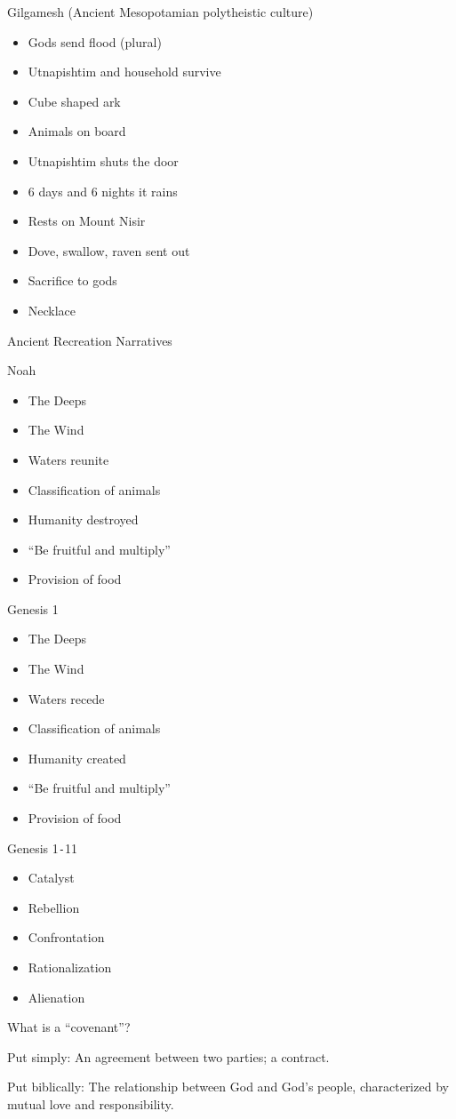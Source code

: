 \documentclass{article}
\begin{document}
    Gilgamesh (Ancient Mesopotamian polytheistic culture)

    \begin{itemize}
        \item Gods send flood (plural)
        \item Utnapishtim and household survive
        \item Cube shaped ark
        \item Animals on board
        \item Utnapishtim shuts the door
        \item 6 days and 6 nights it rains
        \item Rests on Mount Nisir
        \item Dove, swallow, raven sent out
        \item Sacrifice to gods
        \item Necklace
    \end{itemize}

    \centerline{Ancient Recreation Narratives}

    Noah

    \begin{itemize}
        \item The Deeps
        \item The Wind
        \item Waters reunite
        \item Classification of animals
        \item Humanity destroyed
        \item ``Be fruitful and multiply''
        \item Provision of food
    \end{itemize}

    Genesis 1

    \begin{itemize}
        \item The Deeps
        \item The Wind
        \item Waters recede
        \item Classification of animals
        \item Humanity created
        \item ``Be fruitful and multiply''
        \item Provision of food
    \end{itemize}

    \centerline{Genesis 1\texttt{-}11}

    \begin{itemize}
        \item Catalyst
        \item Rebellion
        \item Confrontation
        \item Rationalization
        \item Alienation
    \end{itemize}

    What is a ``covenant''?

    Put simply: An agreement between two parties; a contract.

    Put biblically: The relationship between God and God's people, characterized by mutual love and responsibility.
\end{document}

